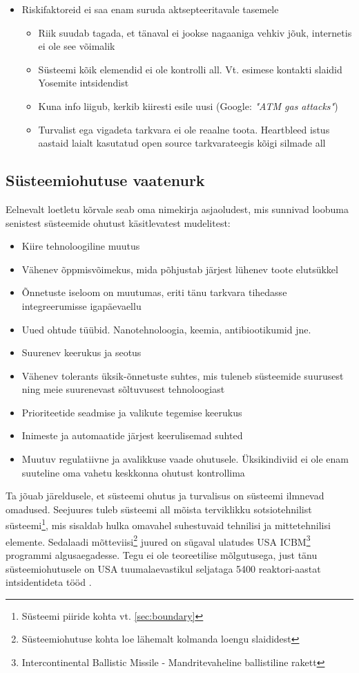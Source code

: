 \documentclass{article}
\begin{document}
\begin{itemize}
		\item Riskifaktoreid ei saa enam suruda aktsepteeritavale tasemele
			\begin{itemize}
		\item Riik suudab tagada, et tänaval ei jookse nagaaniga vehkiv jõuk, internetis ei ole see võimalik
		\item Süsteemi kõik elemendid ei ole kontrolli all. Vt. esimese kontakti slaidid Yosemite intsidendist
		\item Kuna info liigub, kerkib kiiresti esile uusi (Google: \emph{"ATM gas attacks"})
		\item Turvalist ega vigadeta tarkvara ei ole reaalne toota. Heartbleed istus aastaid laialt kasutatud open source tarkvarateegis kõigi silmade all
	\end{itemize}

\end{itemize}

\subsection{Süsteemiohutuse vaatenurk}
Eelnevalt loetletu kõrvale seab \cite{leveson2011engineering} oma nimekirja asjaoludest, mis sunnivad loobuma senistest süsteemide ohutust käsitlevatest mudelitest:
\begin{itemize}
	\item Kiire tehnoloogiline muutus
	\item Vähenev õppmisvõimekus, mida põhjustab järjest lühenev toote elutsükkel
	\item Õnnetuste iseloom on muutumas, eriti tänu tarkvara tihedasse integreerumisse igapäevaellu
	\item Uued ohtude tüübid. Nanotehnoloogia, keemia, antibiootikumid jne.
	\item Suurenev keerukus ja seotus
	\item Vähenev tolerants üksik-õnnetuste suhtes, mis tuleneb süsteemide suurusest ning meie suurenevast sõltuvusest tehnoloogiast
	\item Prioriteetide seadmise ja valikute tegemise keerukus
	\item Inimeste ja automaatide järjest keerulisemad suhted
	\item Muutuv regulatiivne ja avalikkuse vaade ohutusele. Üksikindiviid ei ole enam suuteline oma vahetu keskkonna ohutust kontrollima
\end{itemize}

Ta jõuab järeldusele, et süsteemi ohutus ja turvalisus on süsteemi ilmnevad omadused. Seejuures tuleb süsteemi all mõista terviklikku sotsiotehnilist süsteemi\footnote{Süsteemi piiride kohta vt. \ref{sec:boundary}}, mis sisaldab hulka omavahel suhestuvaid tehnilisi ja mittetehnilisi elemente. Sedalaadi mõtteviisi\footnote{Süsteemiohutuse kohta loe lähemalt kolmanda loengu slaididest} juured on sügaval ulatudes USA ICBM\footnote{Intercontinental Ballistic Missile - Mandritevaheline ballistiline rakett} programmi algusaegadesse. Tegu ei ole teoreetilise mõlgutusega, just tänu süsteemiohutusele on USA tuumalaevastikul seljataga 5400 reaktori-aastat intsidentideta tööd \citep{navy}. 
\end{document}

